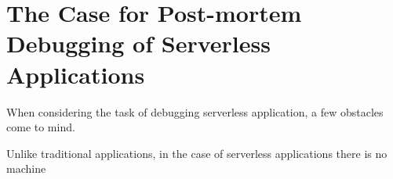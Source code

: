 \section{The Case for Post-mortem Debugging of Serverless Applications}

When considering the task of debugging serverless application, a few obstacles
come to mind. 

Unlike traditional applications, in the case of serverless
applications there is no machine
